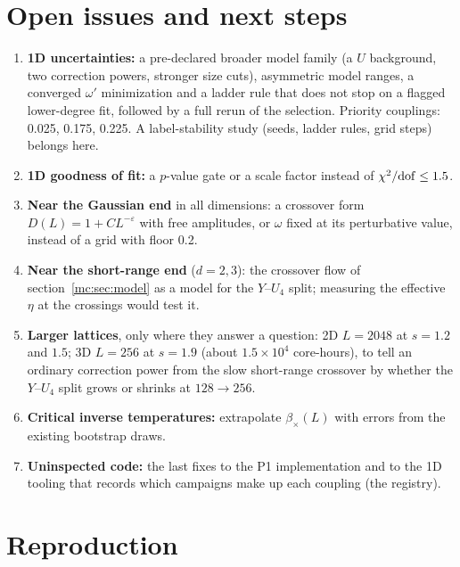 \section{Open issues and next steps}\label{mc:sec:open}
\begin{enumerate}[1.]
\item \textbf{1D uncertainties:} a pre-declared broader model family (a $U$ background, two correction powers, stronger size cuts), asymmetric
 model ranges, a converged $\omega'$ minimization and a ladder rule that does not stop on a flagged lower-degree fit, followed by a full rerun
 of the selection. Priority couplings: 0.025, 0.175, 0.225. A label-stability study (seeds, ladder rules, grid steps) belongs here.
\item \textbf{1D goodness of fit:} a $p$-value gate or a scale factor instead of $\chi^2/{\rm dof}\le1.5$.
\item \textbf{Near the Gaussian end} in all dimensions: a crossover form $D(L)=1+CL^{-\varepsilon}$ with free amplitudes, or $\omega$ fixed at its
 perturbative value, instead of a grid with floor 0.2.
\item \textbf{Near the short-range end} ($d=2,3$): the crossover flow of section~\ref{mc:sec:model} as a model for the $Y$--$U_4$ split; measuring
 the effective $\eta$ at the crossings would test it.
\item \textbf{Larger lattices}, only where they answer a question: 2D $L=2048$ at $s=1.2$ and $1.5$; 3D $L=256$ at $s=1.9$ (about
 $1.5\times10^4$ core-hours), to tell an ordinary correction power from the slow short-range crossover by whether the $Y$--$U_4$ split grows or
 shrinks at $128\to256$.
\item \textbf{Critical inverse temperatures:} extrapolate $\beta_\times(L)$ with errors from the existing bootstrap draws.
\item \textbf{Uninspected code:} the last fixes to the P1 implementation and to the 1D tooling that records which campaigns make up each
 coupling (the registry).
\end{enumerate}

\section{Reproduction}\label{mc:sec:repro}
\sloppy
